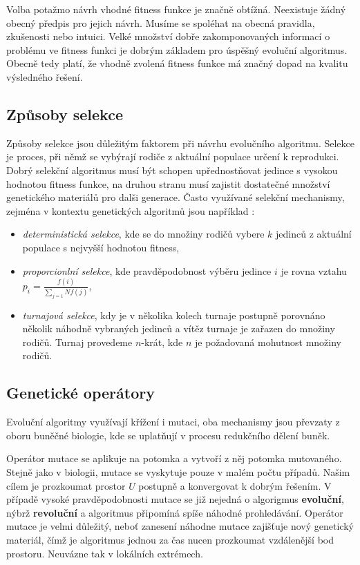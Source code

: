 Volba potažmo návrh vhodné fitness funkce je značně obtížná. Neexistuje žádný obecný
předpis pro jejich návrh. Musíme se spoléhat na obecná pravidla, zkušenosti nebo 
intuici. Velké množství dobře zakomponovaných informací o problému ve fitness funkci je
dobrým základem pro úspěšný evoluční algoritmus. Obecně tedy platí, že 
vhodně zvolená fitness funkce má značný dopad na kvalitu výsledného řešení.

\subsection{Způsoby selekce}
Způsoby selekce jsou důležitým faktorem při návrhu evolučního algoritmu. Selekce
je proces, při němž se vybýrají rodiče z aktuální populace určení k reprodukci. 
Dobrý selekční algoritmus musí být schopen upřednostňovat jedince s vysokou hodnotou
fitness funkce, na druhou stranu musí zajistit dostatečné množství genetického 
materiálů pro dalši generace. Často využívané selekční mechanismy, zejména v kontextu
genetických algoritmů jsou například \cite{selection_schemes_comparison} :

\begin{itemize}
	\item \textit{deterministická selekce}, kde se do množiny rodičů vybere $k$
		jedinců z aktuální populace s nejvyšší hodnotou fitness,
		
	\item \textit{proporcionlní selekce}, kde pravděpodobnost výběru jedince $i$ je 
		rovna vztahu $p_{i} = \frac{f(i)}{\sum_{j=1}{N} f(j)}$,
		
	\item \textit{turnajová selekce}, kdy je v několika kolech turnaje postupně 
		porovnáno několik náhodně vybraných jedinců a vítěz turnaje je zařazen
		do množiny rodičů. Turnaj provedeme $n$-krát, kde $n$ je požadovaná mohutnost
		množiny rodičů. 
\end{itemize}

\subsection{Genetické operátory}
Evoluční algoritmy využívají křížení i mutaci, oba mechanismy jsou převzaty z
oboru buněčné biologie, kde se uplatňují v procesu redukčního dělení buněk.

Operátor mutace se aplikuje na potomka
a vytvoří z něj potomka mutovaného. Stejně jako v biologii, mutace se vyskytuje
pouze v malém počtu případů. Našim cílem je prozkoumat prostor $U$ postupně a
konvergovat k dobrým řešením. V případě vysoké pravděpodobnosti mutace se již
nejedná o algorigmus \textbf{evoluční}, nýbrž \textbf{revoluční} a algoritmus připomíná 
spíše náhodné prohledávání. Operátor mutace je velmi důležitý, neboť zanesení
náhodne mutace zajišťuje nový genetický materiál, čímž je algoritmus jednou za
čas nucen prozkoumat vzdálenější bod prostoru. Neuvázne tak v lokálních extrémech.

